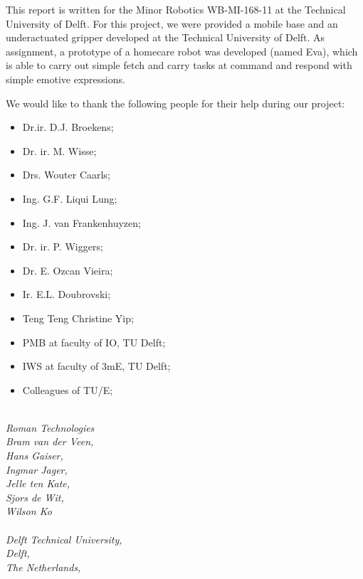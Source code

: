 \documentclass[project_eva.tex]{subfiles}
\begin{document}
\begin{minipage}[h]{2\linewidth}
This report is written for the Minor Robotics WB-MI-168-11 at the Technical University of Delft. For this project, we were provided a mobile base and an underactuated gripper developed at the Technical University of Delft. As assignment, a prototype of a homecare robot was developed (named Eva), which is able to carry out simple fetch and carry tasks at command and respond with simple emotive expressions.

We would like to thank the following people for their help during our project:
\\
\begin{itemize}
\item[] Dr.ir. D.J. Broekens;
\item[] Dr. ir. M. Wisse;
\item[] Drs. Wouter Caarls;
\item[] Ing. G.F. Liqui Lung; 
\item[] Ing. J. van Frankenhuyzen; 
\item[] Dr. ir. P. Wiggers; 
\item[] Dr. E. Ozcan Vieira;
\item[] Ir. E.L. Doubrovski; 
\item[] Teng Teng Christine Yip;
\item[] PMB at faculty of IO, TU Delft;
\item[] IWS at faculty of 3mE, TU Delft;
\item[] Colleagues of TU/E;
\end{itemize}
 

\textit{
\\
Roman Technologies\\
Bram van der Veen,\\
Hans Gaiser,\\
Ingmar Jager,\\
Jelle ten Kate,\\  
Sjors de Wit,\\
Wilson Ko\\\\
Delft Technical University,\\
Delft,\\
The Netherlands,\\
}

\end{minipage}
\clearpage
\end{document}
